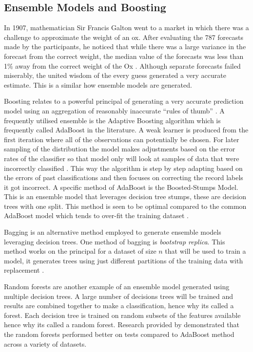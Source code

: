 \subsection{Ensemble Models and Boosting} \label{boosting}

In 1907, mathematician Sir Francis Galton went to a market in which there was a challenge
to approximate the weight of an ox. After evaluating the 787 forecasts made by the
participants, he noticed that while there was a large variance in the forecast from the correct weight, the median value of the
forecasts was less than 1\% away from the correct weight of the Ox \citep{galton_vox_1907}. Although separate forecasts failed miserably, the united wisdom of the every guess generated a very accurate estimate. This is a similar how ensemble models are generated.


Boosting relates to a powerful principal of generating a very accurate prediction model using an aggregation of reasonably inaccurate ``rules of thumb'' \citep{freund_short_1999}. A frequently utilised ensemble is the Adaptive Boosting algorithm which is frequently called AdaBoost in the literature. A weak learner is produced from the first iteration where all of the observations can potentially be chosen. For later sampling of the distribution the model makes adjustments based on the error rates of the classifier so that model only will look at samples of data that were incorrectly classified \citep{freund_short_1999}. This way the algorithm is step by step adapting based on the errors of past classifications and then focuses on correcting the record labels it got incorrect. A specific method of AdaBoost is the Boosted-Stumps Model. This is an ensemble model that leverages decision tree stumps, these are decision trees with one split. This method is seen to be optimal compared to the common AdaBoost model which tends to over-fit the training dataset \citep{caruana_empirical_2006}.

Bagging is an alternative method employed to generate ensemble models leveraging decision trees. One method of bagging is \textit{bootstrap replica}. This method works on the principal for a dataset of size $n$ that will be used to train a model, it generates trees using just different partitions of the training data with replacement \citep{dietterich_experimental_2000}. 

Random forests are another example of an ensemble model generated using multiple decision trees. A large number of decisions trees will be trained and results are combined together to make a classification, hence why its called a forest. Each decision tree is trained on random subsets of the features available hence why its called a random forest. Research provided by \cite{breiman_random_2001} demonstrated that the random forests performed better on tests compared to AdaBoost method across a variety of datasets.


